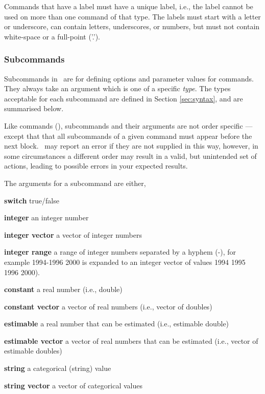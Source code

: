 Commands that have a label must have a unique label, i.e., the label cannot be used on more than one command of that type. The labels must start with a letter or underscore, can contain letters, underscores, or numbers, but must not contain white-space or a full-point ('.').

\subsubsection{Subcommands}

Subcommands in \SPM\ are for defining options and parameter values for commands. They always take an argument which is one of a specific \emph{type}. The types acceptable for each subcommand are defined in Section \ref{sec:syntax}, and are summarised below. 

Like commands (), subcommands and their arguments are not order specific --- except that that all subcommands of a given command must appear before the next  block. \SPM\ may report an error if they are not supplied in this way, however, in some circumstances a different order may result in a valid, but unintended set of actions, leading to possible errors in your expected results.  

The arguments for a subcommand are either,

\begin{description}
\item \textbf{switch} true/false 
\item \textbf{integer} an integer number
\item \textbf{integer vector} a vector of integer numbers
\item \textbf{integer range} a range of integer numbers separated by a hyphem (-), for example 1994-1996 2000 is expanded to an integer vector of values 1994 1995 1996 2000). 
\item \textbf{constant} a real number (i.e., double)
\item \textbf{constant vector} a vector of real numbers (i.e., vector of doubles)
\item \textbf{estimable} a real number that can be estimated (i.e., estimable double)
\item \textbf{estimable vector} a vector of real numbers that can be estimated (i.e., vector of estimable doubles)
\item \textbf{string} a categorical (string) value
\item \textbf{string vector} a vector of categorical values
\end{description}

